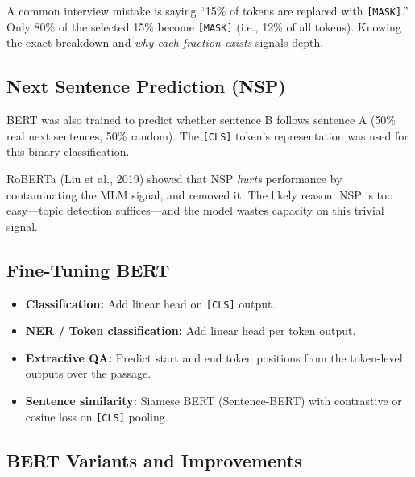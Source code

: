 \begin{warningbox}
A common interview mistake is saying ``15\% of tokens are replaced with
\texttt{[MASK]}.''  Only 80\% of the selected 15\% become \texttt{[MASK]}
(i.e., 12\% of all tokens).  Knowing the exact breakdown and \emph{why each
fraction exists} signals depth.
\end{warningbox}

\subsection{Next Sentence Prediction (NSP)}

BERT was also trained to predict whether sentence B follows sentence A (50\%
real next sentences, 50\% random).  The \texttt{[CLS]} token's representation
was used for this binary classification.

RoBERTa (Liu et al., 2019) showed that NSP \emph{hurts} performance by
contaminating the MLM signal, and removed it.  The likely reason: NSP is too
easy---topic detection suffices---and the model wastes capacity on this trivial
signal.

\subsection{Fine-Tuning BERT}

\begin{itemize}
    \item \textbf{Classification:} Add linear head on \texttt{[CLS]} output.
    \item \textbf{NER / Token classification:} Add linear head per token output.
    \item \textbf{Extractive QA:} Predict start and end token positions from
          the token-level outputs over the passage.
    \item \textbf{Sentence similarity:} Siamese BERT (Sentence-BERT) with
          contrastive or cosine loss on \texttt{[CLS]} pooling.
\end{itemize}

\subsection{BERT Variants and Improvements}

